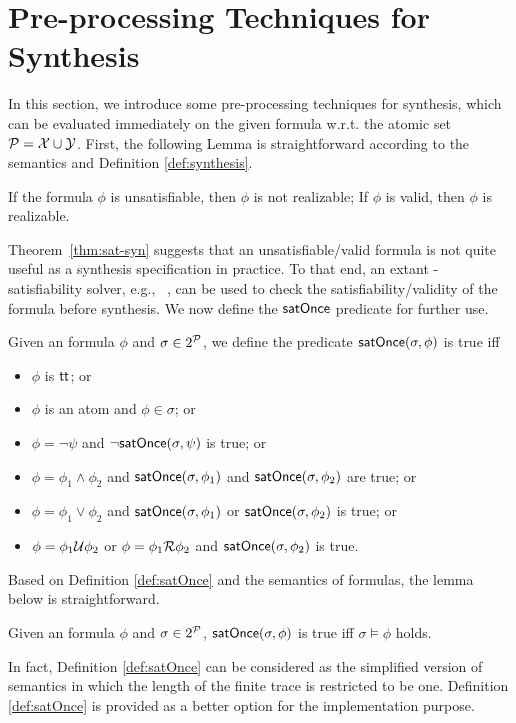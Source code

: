 \section{Pre-processing Techniques for \ltlf Synthesis}
In this section, we introduce some pre-processing techniques for \ltlf synthesis, which can be evaluated immediately on the given \ltlf formula w.r.t. the atomic set $\P=\X\cup\Y$. First, the following Lemma is straightforward according to the \ltlf semantics and Definition \ref{def:synthesis}.

\begin{theorem}\label{thm:sat-syn}
	If the \ltlf formula $\phi$ is unsatisfiable, then $\phi$ is not realizable; If $\phi$ is valid, then $\phi$ is realizable.
\end{theorem}
Theorem~\ref{thm:sat-syn} suggests that an unsatisfiable/valid \ltlf formula is not quite useful as a synthesis specification in practice. 
To that end, an extant \ltlf-satisfiability solver, e.g., \aaltaf~\cite{LRPZV19}, can be used to check the satisfiability/validity of the formula before synthesis. We now define the $\satOnce$ predicate for further use. 

\begin{definition}\label{def:satOnce}
Given an \ltlf formula $\phi$ and $\sigma \in 2^{\P}$, we define the predicate $\satOnce (\sigma, \phi)$ is true iff 
\begin{itemize}
	\item $\phi$ is $\tt$; or
	\item $\phi$ is an atom and $\phi \in \sigma$; or 
	\item $\phi = \neg\psi$ and $\neg \satOnce (\sigma, \psi)$ is true; or
	\item $\phi = \phi_1\wedge\phi_2$ and $\satOnce (\sigma, \phi_1)$ and $\satOnce (\sigma, \phi_2)$ are true; or
	\item $\phi = \phi_1\vee\phi_2$ and $\satOnce (\sigma, \phi_1)$ or $\satOnce (\sigma, \phi_2)$ is true; or
	\item $\phi = \phi_1\U\phi_2$ or $\phi = \phi_1\R\phi_2$ and $\satOnce (\sigma, \phi_2)$ is true.
\end{itemize} 
\end{definition}

Based on Definition \ref{def:satOnce} and the semantics of \ltlf formulas, the lemma below is straightforward. 

\begin{lemma}\label{lem:satOnce}
Given an \ltlf formula $\phi$ and $\sigma\in 2^{\P}$, $\satOnce (\sigma, \phi)$ is true iff $\sigma\models\phi$ holds.
\end{lemma}
In fact, Definition \ref{def:satOnce} can be considered as the simplified version of \ltlf semantics in which the length of the finite trace is restricted to be one. Definition \ref{def:satOnce} is provided as a better option for the implementation purpose. 


